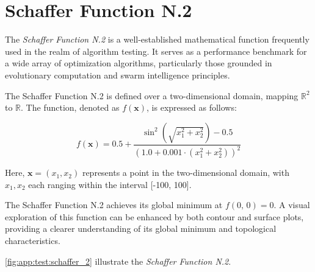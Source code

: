 \section{Schaffer Function N.2}
  The \emph{Schaffer Function N.2} is a well-established mathematical function
  frequently used in the realm of algorithm testing.
  It serves as a performance benchmark for a wide array of optimization
  algorithms, particularly those grounded in evolutionary computation and swarm 
  intelligence principles.

  \begin{definition}
    The Schaffer Function N.2 is defined over a two-dimensional domain, mapping 
    \(\mathbb{R}^2\) to \(\mathbb{R}\).
    The function, denoted as \(f(\mathbf{x})\), is expressed as follows:

    \[
      f(\mathbf{x}) = 0.5 + \frac{
          \sin^2(\sqrt{x_1^2 + x_2^2}) - 0.5
        }{
          (1.0 + 0.001 \cdot (x_1^2 + x_2^2))^2
        }
    \]

    Here, \(\mathbf{x} = (x_1, x_2)\) represents a point in the two-dimensional
    domain, with \(x_1, x_2\) each ranging within the interval [-100, 100].
  \end{definition}

  The Schaffer Function N.2 achieves its global minimum at \(f(0,\,0) = 0\).
  A visual exploration of this function can be enhanced by both contour and 
  surface plots, providing a clearer understanding of its global minimum and 
  topological characteristics.

  \vref{fig:app:test:schaffer_2} illustrate the \textit{Schaffer Function N.2}.

